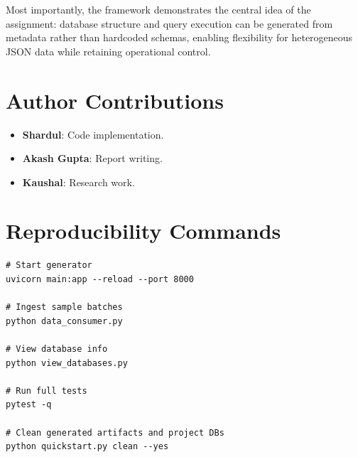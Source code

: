 \documentclass[12pt,a4paper]{article}
\begin{document}
Most importantly, the framework demonstrates the central idea of the assignment: database structure and query execution can be generated from metadata rather than hardcoded schemas, enabling flexibility for heterogeneous JSON data while retaining operational control.

\section{Author Contributions}
\begin{itemize}[leftmargin=*]
  \item \textbf{Shardul}: Code implementation.
  \item \textbf{Akash Gupta}: Report writing.
  \item \textbf{Kaushal}: Research work.
\end{itemize}

\appendix
\section{Reproducibility Commands}
\begin{lstlisting}[style=jsonstyle]
# Start generator
uvicorn main:app --reload --port 8000

# Ingest sample batches
python data_consumer.py

# View database info
python view_databases.py

# Run full tests
pytest -q

# Clean generated artifacts and project DBs
python quickstart.py clean --yes
\end{lstlisting}
\end{document}
